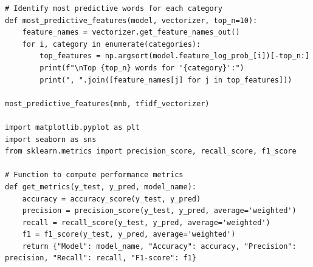\documentclass[a4paper,12pt]{article}
\begin{document}
\begin{lstlisting}[style=python]
# Identify most predictive words for each category
def most_predictive_features(model, vectorizer, top_n=10):
    feature_names = vectorizer.get_feature_names_out()
    for i, category in enumerate(categories):
        top_features = np.argsort(model.feature_log_prob_[i])[-top_n:]
        print(f"\nTop {top_n} words for '{category}':")
        print(", ".join([feature_names[j] for j in top_features]))

most_predictive_features(mnb, tfidf_vectorizer)

import matplotlib.pyplot as plt
import seaborn as sns
from sklearn.metrics import precision_score, recall_score, f1_score

# Function to compute performance metrics
def get_metrics(y_test, y_pred, model_name):
    accuracy = accuracy_score(y_test, y_pred)
    precision = precision_score(y_test, y_pred, average='weighted')
    recall = recall_score(y_test, y_pred, average='weighted')
    f1 = f1_score(y_test, y_pred, average='weighted')
    return {"Model": model_name, "Accuracy": accuracy, "Precision": precision, "Recall": recall, "F1-score": f1}



\end{lstlisting}
\end{document}
